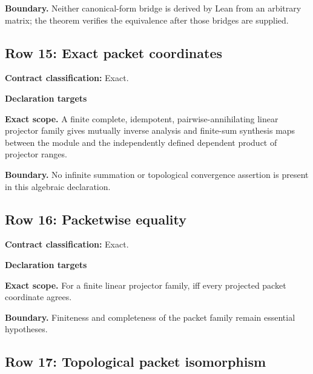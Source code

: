 \par\smallskip\noindent\textbf{Boundary.} Neither canonical-form bridge is derived by Lean from an arbitrary matrix; the theorem verifies the equivalence after those bridges are supplied.
\medskip
{}\subsection{Row 15: Exact packet coordinates}
\label{row:15}
\textbf{Contract classification:} Exact.
\par\smallskip\textbf{Declaration targets}\par
{\small\noindent{}\par}
{\small\noindent{}\par}
{\small\noindent{}\par}
\medskip\noindent\textbf{Exact scope.} A finite complete, idempotent, pairwise-annihilating linear projector family gives mutually inverse analysis and finite-sum synthesis maps between the module and the independently defined dependent product of projector ranges.
\par\smallskip\noindent\textbf{Boundary.} No infinite summation or topological convergence assertion is present in this algebraic declaration.
\medskip
{}\subsection{Row 16: Packetwise equality}
\label{row:16}
\textbf{Contract classification:} Exact.
\par\smallskip\textbf{Declaration targets}\par
{\small\noindent{}\par}
\medskip\noindent\textbf{Exact scope.} For a finite linear projector family,  iff every projected packet coordinate agrees.
\par\smallskip\noindent\textbf{Boundary.} Finiteness and completeness of the packet family remain essential hypotheses.
\medskip
{}\subsection{Row 17: Topological packet isomorphism}
